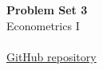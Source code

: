 \documentclass[11pt,a4paper]{article}
\begin{document}
\begin{center}
{\LARGE\bfseries Problem Set 3}\\[6pt]
{\large Econometrics I}\\[5pt]
\SubmissionName\\[5pt]
\ifdefempty{\RepositoryURL}
{}
{\href{\RepositoryURL}{GitHub repository}}
\end{center}
\vspace{4pt}

\clearpage

\clearpage

\clearpage

\clearpage

\end{document}
